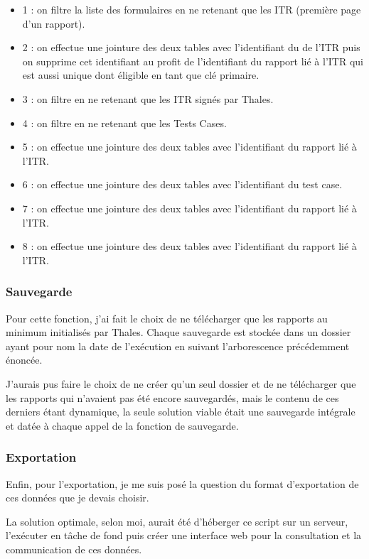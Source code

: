 \begin{itemize}
\item 1 : on filtre la liste des formulaires en ne retenant que les ITR (première page d'un rapport).
\item 2 : on effectue une jointure des deux tables avec l'identifiant du de l'ITR puis on supprime cet identifiant au profit de l'identifiant du rapport lié à l'ITR qui est aussi unique dont éligible en tant que clé primaire.
\item 3 : on filtre en ne retenant que les ITR signés par Thales.
\item 4 : on filtre en ne retenant que les Tests Cases.
\item 5 : on effectue une jointure des deux tables avec l'identifiant du rapport lié à l'ITR.
\item 6 : on effectue une jointure des deux tables avec l'identifiant du test case.
\item 7 : on effectue une jointure des deux tables avec l'identifiant du rapport lié à l'ITR.
\item 8 : on effectue une jointure des deux tables avec l'identifiant du rapport lié à l'ITR.
\end{itemize}

\subsubsection{Sauvegarde}
Pour cette fonction, j'ai fait le choix de ne télécharger que les rapports au minimum initialisés par Thales. Chaque sauvegarde est stockée dans un dossier ayant pour nom la date de l'exécution en suivant l'arborescence précédemment énoncée.

J'aurais pus faire le choix de ne créer qu'un seul dossier et de ne télécharger que les rapports qui n'avaient pas été encore sauvegardés,
mais le contenu de ces derniers étant dynamique, la seule solution viable était une sauvegarde intégrale et datée à chaque appel de la fonction de sauvegarde.
\subsubsection{Exportation}
Enfin, pour l'exportation, je me suis posé la question du format d'exportation de ces données que je devais choisir.

La solution optimale, selon moi, aurait été d'héberger ce script sur un serveur, l'exécuter en tâche de fond puis créer une interface web pour la consultation et la communication de ces données.

